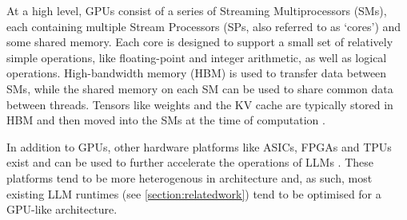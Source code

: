 \documentclass[12pt,twoside]{report}
\begin{document}
At a high level, GPUs consist of a series of Streaming Multiprocessors (SMs), each containing multiple Stream Processors (SPs, also referred to as `cores') and some shared memory\cite{choquette2021nvidia}. 
Each core is designed to support a small set of relatively simple operations, like floating-point and integer arithmetic, as well as logical operations.
High-bandwidth memory (HBM) is used to transfer data between SMs, while the shared memory on each SM can be used to share common data between threads.
Tensors like weights and the KV cache are typically stored in HBM and then moved into the SMs at the time of computation \cite{pope2023efficiently}.

In addition to GPUs, other hardware platforms like ASICs, FPGAs and TPUs exist and can be used to further accelerate the operations of LLMs \cite{li2024large}.
These platforms tend to be more heterogenous in architecture and, as such, most existing LLM runtimes (see \ref{section:relatedwork}) tend to be optimised for a GPU-like architecture.
\end{document}
